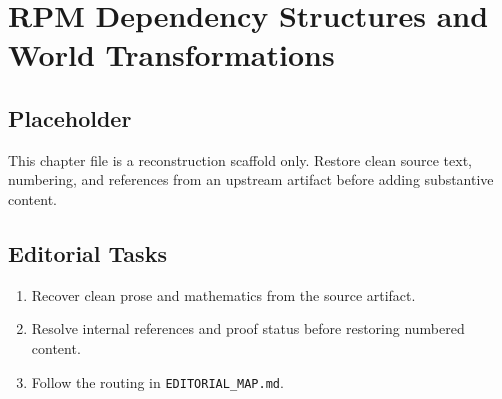 \chapter{RPM Dependency Structures and World Transformations}
\label{chap:rpm-dependency-structures-and-world-transformations}

\section*{Placeholder}
This chapter file is a reconstruction scaffold only. Restore clean source text, numbering, and references from an upstream artifact before adding substantive content.

\section*{Editorial Tasks}
\begin{enumerate}
\item Recover clean prose and mathematics from the source artifact.
\item Resolve internal references and proof status before restoring numbered content.
\item Follow the routing in \texttt{EDITORIAL\_MAP.md}.
\end{enumerate}
